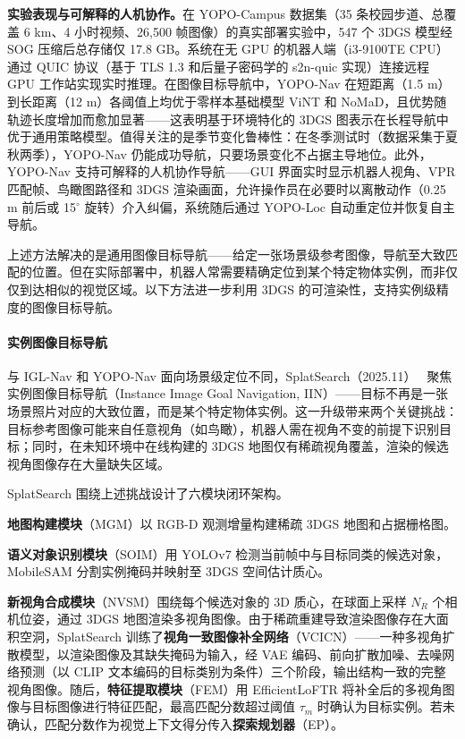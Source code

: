 \textbf{实验表现与可解释的人机协作。}在 YOPO-Campus 数据集（35 条校园步道、总覆盖 6 km、4 小时视频、26,500 帧图像）的真实部署实验中，547 个 3DGS 模型经 SOG 压缩后总存储仅 17.8 GB。系统在无 GPU 的机器人端（i3-9100TE CPU）通过 QUIC 协议（基于 TLS 1.3 和后量子密码学的 s2n-quic 实现）连接远程 GPU 工作站实现实时推理。在图像目标导航中，YOPO-Nav 在短距离（1.5 m）到长距离（12 m）各阈值上均优于零样本基础模型 ViNT 和 NoMaD，且优势随轨迹长度增加而愈加显著——这表明基于环境特化的 3DGS 图表示在长程导航中优于通用策略模型。值得关注的是季节变化鲁棒性：在冬季测试时（数据采集于夏秋两季），YOPO-Nav 仍能成功导航，只要场景变化不占据主导地位。此外，YOPO-Nav 支持可解释的人机协作导航——GUI 界面实时显示机器人视角、VPR 匹配帧、鸟瞰图路径和 3DGS 渲染画面，允许操作员在必要时以离散动作（0.25 m 前后或 15$^\circ$ 旋转）介入纠偏，系统随后通过 YOPO-Loc 自动重定位并恢复自主导航。

上述方法解决的是通用图像目标导航——给定一张场景级参考图像，导航至大致匹配的位置。但在实际部署中，机器人常需要精确定位到某个特定物体实例，而非仅仅到达相似的视觉区域。以下方法进一步利用 3DGS 的可渲染性，支持实例级精度的图像目标导航。

\paragraph{实例图像目标导航}

与 IGL-Nav 和 YOPO-Nav 面向场景级定位不同，SplatSearch（2025.11）~\cite{2511_12972} 聚焦实例图像目标导航（Instance Image Goal Navigation, IIN）——目标不再是一张场景照片对应的大致位置，而是某个特定物体实例。这一升级带来两个关键挑战：目标参考图像可能来自任意视角（如鸟瞰），机器人需在视角不变的前提下识别目标；同时，在未知环境中在线构建的 3DGS 地图仅有稀疏视角覆盖，渲染的候选视角图像存在大量缺失区域。

SplatSearch 围绕上述挑战设计了六模块闭环架构。

\textbf{地图构建模块}（MGM）以 RGB-D 观测增量构建稀疏 3DGS 地图和占据栅格图。

\textbf{语义对象识别模块}（SOIM）用 YOLOv7 检测当前帧中与目标同类的候选对象，MobileSAM 分割实例掩码并映射至 3DGS 空间估计质心。

\textbf{新视角合成模块}（NVSM）围绕每个候选对象的 3D 质心，在球面上采样 $N_R$ 个相机位姿，通过 3DGS 地图渲染多视角图像。由于稀疏重建导致渲染图像存在大面积空洞，SplatSearch 训练了\textbf{视角一致图像补全网络}（VCICN）——一种多视角扩散模型，以渲染图像及其缺失掩码为输入，经 VAE 编码、前向扩散加噪、去噪网络预测（以 CLIP 文本编码的目标类别为条件）三个阶段，输出结构一致的完整视角图像。随后，\textbf{特征提取模块}（FEM）用 EfficientLoFTR 将补全后的多视角图像与目标图像进行特征匹配，最高匹配分数超过阈值 $\tau_m$ 时确认为目标实例。若未确认，匹配分数作为视觉上下文得分传入\textbf{探索规划器}（EP）。

